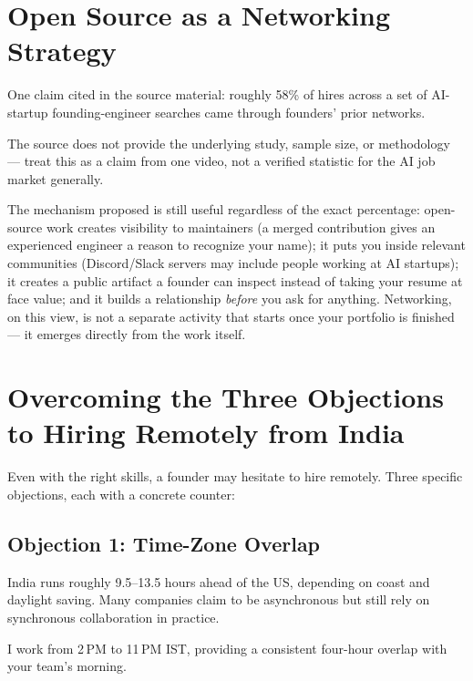 \section{Open Source as a Networking Strategy}

One claim cited in the source material: roughly 58\% of hires across a set of AI-startup founding-engineer
searches came through founders' prior networks.

\begin{caution}
The source does not provide the underlying study, sample size, or methodology — treat this as a claim from one
video, not a verified statistic for the AI job market generally.
\end{caution}

The mechanism proposed is still useful regardless of the exact percentage: open-source work creates visibility
to maintainers (a merged contribution gives an experienced engineer a reason to recognize your name); it puts
you inside relevant communities (Discord/Slack servers may include people working at AI startups); it creates a
public artifact a founder can inspect instead of taking your resume at face value; and it builds a relationship
\emph{before} you ask for anything. Networking, on this view, is not a separate activity that starts once your
portfolio is finished — it emerges directly from the work itself.

\section{Overcoming the Three Objections to Hiring Remotely from India}

Even with the right skills, a founder may hesitate to hire remotely. Three specific objections, each with a
concrete counter:

\subsection{Objection 1: Time-Zone Overlap}

India runs roughly 9.5--13.5 hours ahead of the US, depending on coast and daylight saving. Many companies claim
to be asynchronous but still rely on synchronous collaboration in practice.

\begin{template}
I work from 2\,PM to 11\,PM IST, providing a consistent four-hour overlap with your team's morning.
\end{template}

